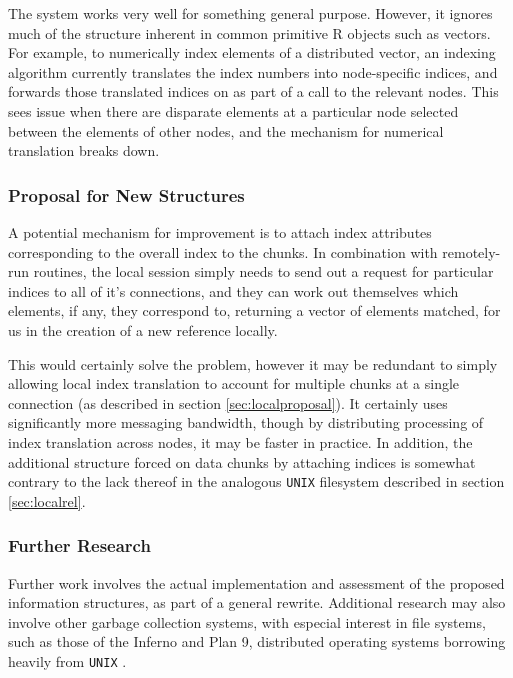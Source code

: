 The system works very well for something general purpose. However, it
ignores much of the structure inherent in common primitive R objects
such as vectors. For example, to numerically index elements of a
distributed vector, an indexing algorithm currently translates the index
numbers into node-specific indices, and forwards those translated
indices on as part of a call to the relevant nodes. This sees issue when
there are disparate elements at a particular node selected between the
elements of other nodes, and the mechanism for numerical translation
breaks down.

\hypertarget{proposal-for-new-structures}{%
\subsubsection{Proposal for New
Structures}\label{proposal-for-new-structures}}

A potential mechanism for improvement is to attach index attributes
corresponding to the overall index to the chunks. In combination with
remotely-run routines, the local session simply needs to send out a
request for particular indices to all of it's connections, and they can
work out themselves which elements, if any, they correspond to,
returning a vector of elements matched, for us in the creation of a new
reference locally.

This would certainly solve the problem, however it may be redundant to
simply allowing local index translation to account for multiple chunks
at a single connection (as described in section
\ref{sec:localproposal}). It certainly uses significantly more
messaging bandwidth, though by distributing processing of index
translation across nodes, it may be faster in practice. In addition, the
additional structure forced on data chunks by attaching indices is
somewhat contrary to the lack thereof in the analogous \texttt{UNIX}
filesystem described in section \ref{sec:localrel}.

\hypertarget{further-research}{%
\subsubsection{Further Research}\label{further-research}}

Further work involves the actual implementation and assessment of the
proposed information structures, as part of a general rewrite.
Additional research may also involve other garbage collection systems,
with especial interest in file systems, such as those of the Inferno and
Plan 9, distributed operating systems borrowing heavily from
\texttt{UNIX} \cite{dorward1997inferno}\cite{pike1995plan}.

